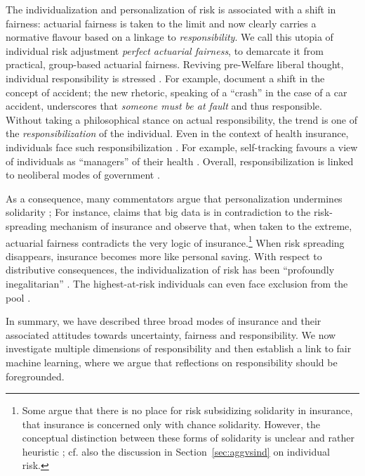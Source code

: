 \documentclass[11pt]{article} %
\makeatletter
\newcommand*{\cf}{cf.\@\xspace}
\makeatother
\begin{document}
The individualization and personalization of risk is associated with a shift in fairness: actuarial fairness is taken to the limit and now clearly carries a normative flavour based on a linkage to  \textit{responsibility}. We call this utopia of individual risk adjustment \textit{perfect actuarial fairness}, to demarcate it from practical, group-based actuarial fairness. Reviving pre-Welfare liberal thought, individual responsibility is stressed \citep{dean1998risk}. For example, \citet{ericson2000moral} document a shift in the concept of accident; the new rhetoric, speaking of a ``crash'' in the case of a car accident, underscores that \textit{someone must be at fault} and thus responsible. Without taking a philosophical stance on actual responsibility, the trend is one of the \textit{responsibilization} of the individual. Even in the context of health insurance, individuals face such responsibilization \citep{van2006making,prainsack2020shifting}. For example, self-tracking favours a view of individuals as ``managers'' of their health \citep{lupton2016diverse,sharon2017self}. Overall, responsibilization is linked to neoliberal modes of government \citep{dean1998risk,ericson2000moral,meyers2018enacting}.

As a consequence, many commentators argue that personalization undermines solidarity \citep{Rosanvallon2000-ROSTNS-2,prainsack2020shifting,barry2020insurance,cevolini2020pool}; For instance, \citet{swedloff2014risk} claims that big data is in contradiction to the risk-spreading mechanism of insurance and \citet{martinez2016fair} observe that, when taken to the extreme, actuarial fairness contradicts the very logic of insurance.\footnote{Some argue that there is no place for risk subsidizing solidarity in insurance, that insurance is concerned only with chance solidarity. However, the conceptual distinction between these forms of solidarity is unclear and rather heuristic \citep{frezal2020fairness}; \cf also the discussion in Section~\ref{sec:aggvsind} on individual risk.} When risk spreading disappears, insurance becomes more like personal saving. With respect to distributive consequences, the individualization of risk has been ``profoundly inegalitarian'' \citep{armstrong2005equality}. The highest-at-risk individuals can even face exclusion from the pool \citep{lehtonen2015producing,cevolini2020pool}.

In summary, we have described three broad modes of insurance and their associated attitudes towards uncertainty, fairness and responsibility. We now investigate multiple dimensions of responsibility and then establish a link to fair machine learning, where we argue that reflections on responsibility should be foregrounded.
\end{document}
